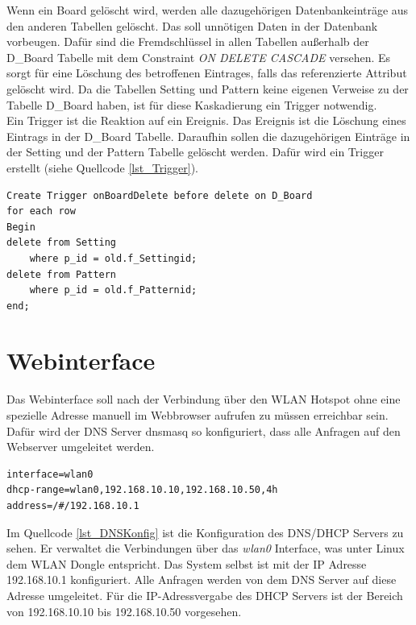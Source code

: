 Wenn ein Board gelöscht wird, werden alle dazugehörigen Datenbankeinträge aus den anderen Tabellen gelöscht. Das soll unnötigen Daten in der Datenbank vorbeugen. Dafür sind die Fremdschlüssel in allen Tabellen außerhalb der D\_Board Tabelle mit dem Constraint \textit{ON DELETE CASCADE} versehen. Es sorgt für eine Löschung des betroffenen Eintrages, falls das referenzierte Attribut gelöscht wird. Da die Tabellen Setting und Pattern keine eigenen Verweise zu der Tabelle D\_Board haben, ist für diese Kaskadierung ein Trigger notwendig. \\
Ein Trigger ist die Reaktion auf ein Ereignis. Das Ereignis ist die Löschung eines Eintrags in der D\_Board Tabelle. Daraufhin sollen die dazugehörigen Einträge in der Setting und der Pattern Tabelle gelöscht werden. Dafür wird ein Trigger erstellt (siehe Quellcode \ref{lst_Trigger}).\\

\begin{lstlisting}[caption={onBoardDelete Trigger},label=lst_Trigger]
Create Trigger onBoardDelete before delete on D_Board 
for each row 
Begin 
delete from Setting 
	where p_id = old.f_Settingid;
delete from Pattern 
	where p_id = old.f_Patternid;
end;
\end{lstlisting}



\newpage
\section{Webinterface}
Das Webinterface soll nach der Verbindung über den WLAN Hotspot ohne eine spezielle Adresse manuell im Webbrowser aufrufen zu müssen erreichbar sein. Dafür wird der DNS Server dnsmasq so konfiguriert, dass alle Anfragen auf den Webserver umgeleitet werden.

\begin{lstlisting}[caption={DHCP/DNS Konfiguration},label=lst_DNSKonfig]
interface=wlan0
dhcp-range=wlan0,192.168.10.10,192.168.10.50,4h
address=/#/192.168.10.1
\end{lstlisting}

Im Quellcode \ref{lst_DNSKonfig} ist die Konfiguration des DNS/DHCP Servers zu sehen. Er verwaltet die Verbindungen über das \textit{wlan0} Interface, was unter Linux dem WLAN Dongle entspricht. Das System selbst ist mit der IP Adresse 192.168.10.1 konfiguriert. Alle Anfragen werden von dem DNS Server auf diese Adresse umgeleitet. Für die IP-Adressvergabe des DHCP Servers ist der Bereich von 192.168.10.10 bis 192.168.10.50 vorgesehen. 


